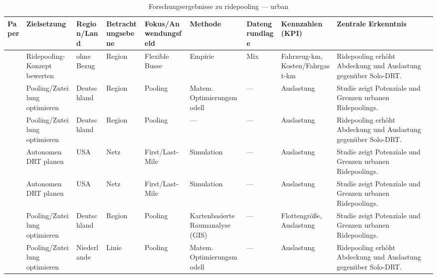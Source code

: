 \begin{table}[p]
\centering
\caption{Forschungsergebnisse zu ridepooling — urban}
\label{tab:ridepooling-urban-2}
\scriptsize
\setlength{\tabcolsep}{2.5pt}
\begin{tabularx}{\textwidth}{
  >{\RaggedRight\arraybackslash}p{2.8cm}
  >{\RaggedRight\arraybackslash}p{2.2cm}
  >{\RaggedRight\arraybackslash}p{1.8cm}
  >{\RaggedRight\arraybackslash}p{1.8cm}
  >{\RaggedRight\arraybackslash}p{2.0cm}
  >{\RaggedRight\arraybackslash}p{2.6cm}
  >{\RaggedRight\arraybackslash}p{1.8cm}
  >{\RaggedRight\arraybackslash}p{2.2cm}
  >{\RaggedRight\arraybackslash}X
}
\toprule
Paper & Zielsetzung & Region/Land & Betrachtungsebene & Fokus/Anwendungsfeld & Methode & Datengrundlage & Kennzahlen (KPI) & Zentrale Erkenntnis \\
\midrule
\textcite{chen\_2021\_exploringimpactsof} & Ridepooling-Konzept bewerten & ohne Bezug & Region & Flexible Busse & Empirie & Mix & Fahrzeug-km, Kosten/Fahrgast-km & Ridepooling erhöht Abdeckung und Auslastung gegenüber Solo-DRT. \\ \hline
\textcite{engelhardt\_2020\_speedupheuristicfo} & Pooling/Zuteilung optimieren & Deutschland & Region & Pooling & Matem. Optimierungsmodell & — & Auslastung & Studie zeigt Potenziale und Grenzen urbanen Ridepoolings. \\ \hline
\textcite{engelhardt\_2023\_predictivevehicler} & Pooling/Zuteilung optimieren & Deutschland & Region & Pooling & — & — & Auslastung & Ridepooling erhöht Abdeckung und Auslastung gegenüber Solo-DRT. \\ \hline
\textcite{fagnant\_2018\_dynamicridesharing} & Autonomen DRT planen & USA & Netz & First/Last-Mile & Simulation & — & Auslastung & Studie zeigt Potenziale und Grenzen urbanen Ridepoolings. \\ \hline
\textcite{fagnant\_2018\_dynamicridesharing} & Autonomen DRT planen & USA & Netz & First/Last-Mile & Simulation & — & Auslastung & Studie zeigt Potenziale und Grenzen urbanen Ridepoolings. \\ \hline
\textcite{fehn\_2023\_rideparcelpoolingi} & Pooling/Zuteilung optimieren & Deutschland & Region & Pooling & Kartenbasierte Raumanalyse (GIS) & — & Flottengröße, Auslastung & Studie zeigt Potenziale und Grenzen urbanen Ridepoolings. \\ \hline
\textcite{fielbaum\_2024\_improvingpublictra} & Pooling/Zuteilung optimieren & Niederlande & Linie & Pooling & Matem. Optimierungsmodell & — & Auslastung & Ridepooling erhöht Abdeckung und Auslastung gegenüber Solo-DRT. \\ \hline
\bottomrule
\end{tabularx}
\end{table}
